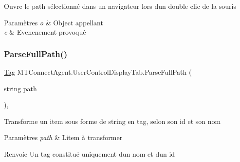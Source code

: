 Ouvre le path sélectionné dans un navigateur lors d\textquotesingle{}un double clic de la souris 


\begin{DoxyParams}{Paramètres}
{\em o} & Object appellant\\
\hline
{\em e} & Evenenement provoqué\\
\hline
\end{DoxyParams}
\mbox{\label{class_m_t_connect_agent_1_1_user_control_display_tab_adee83739d03527dcd7dd13c95d8ca3c9}} 
\subsubsection{\texorpdfstring{Parse\+Full\+Path()}{ParseFullPath()}}
{\footnotesize\ttfamily \mbox{\hyperlink{class_m_t_connect_agent_1_1_model_1_1_tag}{Tag}} M\+T\+Connect\+Agent.\+User\+Control\+Display\+Tab.\+Parse\+Full\+Path (\begin{DoxyParamCaption}\item[{string}]{path }\end{DoxyParamCaption})\hspace{0.3cm}{\ttfamily [inline]}, {\ttfamily [private]}}



Transforme un item sous forme de string en tag, selon son id et son nom 


\begin{DoxyParams}{Paramètres}
{\em path} & L\textquotesingle{}item à transformer\\
\hline
\end{DoxyParams}
\begin{DoxyReturn}{Renvoie}
Un tag constitué uniquement d\textquotesingle{}un nom et d\textquotesingle{}un id
\end{DoxyReturn}
\mbox{\label{class_m_t_connect_agent_1_1_user_control_display_tab_a9645609103b3c419c143c6f0becad308}} 
